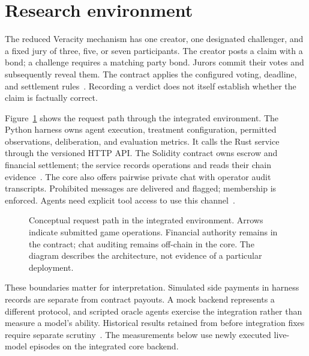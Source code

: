\section{Research environment}
\label{sec:system}

The reduced Veracity mechanism has one creator, one designated challenger, and
a fixed jury of three, five, or seven participants. The creator posts a claim
with a bond; a challenge requires a matching party bond. Jurors commit their
votes and subsequently reveal them. The contract applies the configured voting,
deadline, and settlement rules~\cite{project-spec}. Recording a verdict does
not itself establish whether the claim is factually correct.

Figure~\ref{fig:architecture} shows the request path through the integrated
environment. The Python harness owns agent execution, treatment configuration,
permitted observations, deliberation, and evaluation metrics. It calls the Rust
service through the versioned HTTP API. The Solidity contract owns escrow and
financial settlement; the service records operations and reads their chain
evidence~\cite{project-integration}. The core also offers pairwise private chat
with operator audit transcripts. Prohibited messages are delivered and flagged;
membership is enforced. Agents need explicit tool access to use this
channel~\cite{project-chat}.

\begin{figure}[htbp]
  \centering
  \caption{Conceptual request path in the integrated environment. Arrows
  indicate submitted game operations. Financial authority remains in the
  contract; chat auditing remains off-chain in the core. The diagram
  describes the architecture, not evidence of a particular deployment.}
  \label{fig:architecture}
\end{figure}

These boundaries matter for interpretation. Simulated side payments in harness
records are separate from contract payouts. A mock backend represents a different
protocol, and scripted oracle agents exercise the integration rather than
measure a model's ability. Historical results retained from before integration
fixes require separate scrutiny~\cite{project-harness}. The measurements below
use newly executed live-model episodes on the integrated core backend.
